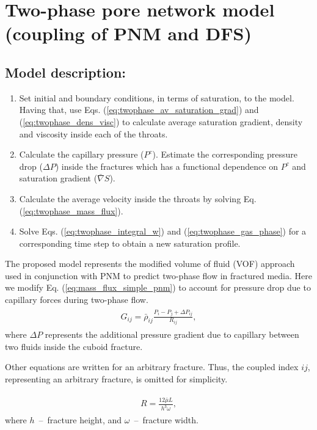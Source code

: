 \documentclass[a4paper,12pt]{extreport}
\begin{document}
\newpage
 \section*{Two-phase pore network model (coupling of  PNM and DFS)}
 
 \subsection*{Model description:} \label{s1}
 \begin{enumerate}
 	\item Set initial and boundary conditions, in terms of saturation, to the model. Having that, use Eqs. (\ref{eq:twophase_av_saturation_grad}) and (\ref{eq:twophase_dens_visc}) to calculate average saturation gradient, density and viscosity inside each of the throats. 
 	\item Calculate the capillary pressure ($P^c$). Estimate the corresponding pressure drop ($\Delta P$) inside the fractures which has a functional dependence on $P^c$ and saturation gradient ($\bar{\nabla} S$).
 	\item Calculate the average velocity inside the throats by solving Eq. (\ref{eq:twophase_mass_flux}).
 	\item Solve Eqs. (\ref{eq:twophase_integral_w}) and (\ref{eq:twophase_gas_phase}) for a corresponding time step to obtain a new saturation profile.
 \end{enumerate}
 
 The proposed model represents the modified volume of fluid (VOF) approach used in conjunction with PNM to predict two-phase flow in fractured media.  
 Here we modify Eq. (\ref{eq:mass_flux_simple_pnm}) to account for pressure drop due to capillary forces during two-phase flow. 
 \begin{eqnarray}
 \begin{gathered}
 \label{eq:twophase_mass_flux}
 G_{ij} = \bar{\rho}_{ij} \frac{P_{i} - P_{j} + \Delta P_{ij}}{R_{ij}},
 \end{gathered}
 \end{eqnarray}
  where $\Delta P$ represents the additional pressure gradient due to capillary between two fluids inside the cuboid fracture.
  
  Other equations are written for an arbitrary fracture. Thus, the coupled index $ij$, representing an arbitrary fracture, is omitted for simplicity.
  
  \begin{eqnarray}
  \begin{gathered}
  \label{eq:twophase_mass_hydr_conductance}
  R = \frac{12 \bar{\mu} L}{h^{3} \omega},
  \end{gathered}
  \end{eqnarray}
  where $h$~--~fracture height, and $\omega$~--~fracture width.
  
\end{document}
